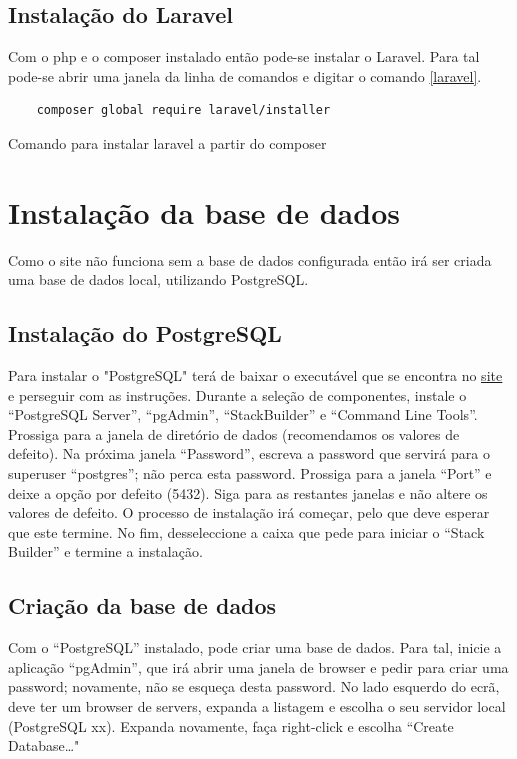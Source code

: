 \documentclass[11pt, twoside]{report}
\begin{document}
\section{Instalação do Laravel}

Com o php e o composer instalado então pode-se instalar o Laravel. Para tal pode-se abrir uma janela da linha de comandos e digitar o comando \ref{laravel}.

	\begin{listing}[H]
	\begin{verbatim}
	composer global require laravel/installer
	\end{verbatim}
	\caption{Comando para instalar laravel a partir do composer}
	\label{laravel}
	
\end{listing}

\chapter{Instalação da base de dados}

Como o site não funciona sem a base de dados configurada então irá ser criada uma base de dados local, utilizando PostgreSQL.

\section{Instalação do PostgreSQL}
Para instalar o "PostgreSQL" terá de baixar o executável que se encontra no \href{https://www.postgresql.org/download/windows/}{\underline{site}} e perseguir com as instruções. Durante a seleção de 
componentes, instale o “PostgreSQL Server”, “pgAdmin”, “StackBuilder” e “Command Line Tools”. 
Prossiga para a janela de diretório de dados (recomendamos os valores de defeito). Na próxima 
janela “Password”, escreva a password que servirá para o superuser “postgres”; não perca esta 
password. Prossiga para a janela “Port” e deixe a opção por defeito (5432). Siga para as restantes 
janelas e não altere os valores de defeito. O processo de instalação irá começar, pelo que deve 
esperar que este termine. No fim, desseleccione a caixa que pede para iniciar o “Stack Builder” e 
termine a instalação.

\section{Criação da base de dados}
Com o “PostgreSQL” instalado, pode criar uma base de dados. Para tal, inicie a aplicação 
“pgAdmin”, que irá abrir uma janela de browser e pedir para criar uma password; novamente, não 
se esqueça desta password. No lado esquerdo do ecrã, deve ter um browser de servers, expanda 
a listagem e escolha o seu servidor local (PostgreSQL xx). Expanda novamente, faça right-click e 
escolha ``Create Database…"
\end{document}
